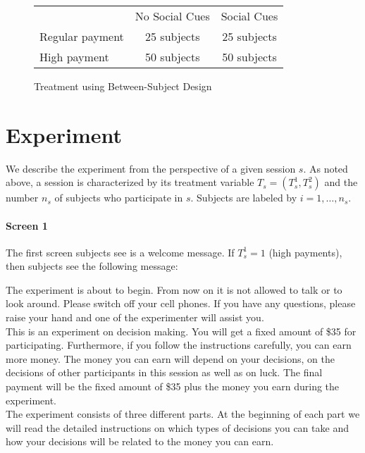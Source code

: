 \documentclass[11pt]{article}
\begin{document}
\begin{figure}[h]
\begin{center}
\begin{tabular}{lcc}
& No Social Cues & Social Cues  \\ \cline{2-3}
Regular payment & \multicolumn{1}{|c|}{25 subjects} & \multicolumn{1}{c|}{25 subjects}  \\ \cline{2-3}
High payment & \multicolumn{1}{|c|}{50 subjects} & \multicolumn{1}{c|}{50 subjects}  \\ \cline{2-3}
\end{tabular}
\end{center}
\caption{Treatment using Between-Subject Design} \label{fig:design}
\end{figure}

\section{Experiment}

We describe the experiment from the perspective of a given session $s$. As noted above, a session is characterized by its treatment variable $T_s=(T_s^1,T_s^2)$ and the number $n_s$ of subjects who participate in $s$. Subjects are labeled by $i=1,\ldots, n_s$.

\paragraph{Screen 1} The first screen subjects see is a welcome message. If $T_s^1=1$ (high payments), then subjects see the following message:

\begin{tcolorbox}
The experiment is about to begin. From now on it is not allowed to talk or to look around. Please switch off your cell phones. If you have any questions, please raise your hand and one of the experimenter will assist you.\\

This is an experiment on decision making. You will get a fixed amount of \$35 for participating. Furthermore, if you follow the instructions carefully, you can earn more money. The money you can earn will depend on your decisions, on the decisions of other participants in this session as well as on luck. The final payment will be the fixed amount of \$35 plus the money you earn during the experiment.\\

The experiment consists of three different parts.  At the beginning of each part we will read the detailed instructions on which types of decisions you can take and how your decisions will be related to the money you can earn.
\end{tcolorbox}
\end{document}
